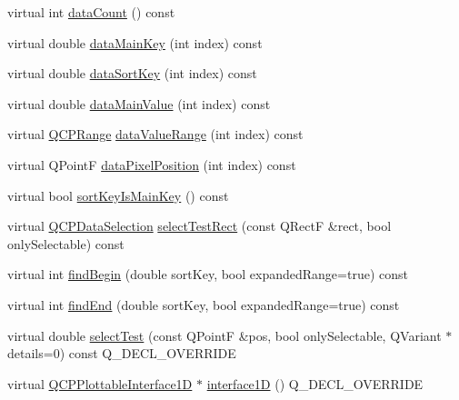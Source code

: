 \begin{DoxyCompactItemize}
\item 
virtual int \hyperlink{class_q_c_p_error_bars_ac3d99896de7fdf339d105fbff7f960be}{data\+Count} () const 
\item 
virtual double \hyperlink{class_q_c_p_error_bars_a4d3e459cf4739949f3566021a229ee53}{data\+Main\+Key} (int index) const 
\item 
virtual double \hyperlink{class_q_c_p_error_bars_a2b37b7ddb99e9e3ff76ac8f4172b7ee4}{data\+Sort\+Key} (int index) const 
\item 
virtual double \hyperlink{class_q_c_p_error_bars_aa4ac3e906e11d23e6ad9d30f15d6f991}{data\+Main\+Value} (int index) const 
\item 
virtual \hyperlink{class_q_c_p_range}{Q\+C\+P\+Range} \hyperlink{class_q_c_p_error_bars_a2b909b80bdfbe6f7ffa3f392528fab2a}{data\+Value\+Range} (int index) const 
\item 
virtual Q\+PointF \hyperlink{class_q_c_p_error_bars_a67d5d86bd035ffc47e33fcf6865e1480}{data\+Pixel\+Position} (int index) const 
\item 
virtual bool \hyperlink{class_q_c_p_error_bars_a668aeaf542891da7859e3075c6c1b5c6}{sort\+Key\+Is\+Main\+Key} () const 
\item 
virtual \hyperlink{class_q_c_p_data_selection}{Q\+C\+P\+Data\+Selection} \hyperlink{class_q_c_p_error_bars_a7d0336c69635e49e351c2c4cf5418ad2}{select\+Test\+Rect} (const Q\+RectF \&rect, bool only\+Selectable) const 
\item 
virtual int \hyperlink{class_q_c_p_error_bars_a87d81a85fc89a93e9cc5e31a9c011018}{find\+Begin} (double sort\+Key, bool expanded\+Range=true) const 
\item 
virtual int \hyperlink{class_q_c_p_error_bars_aa73016e62fb8dbef4dd44d0b080ddf8a}{find\+End} (double sort\+Key, bool expanded\+Range=true) const 
\item 
virtual double \hyperlink{class_q_c_p_error_bars_a78990786eb7632c9ba07105888eb6b1c}{select\+Test} (const Q\+PointF \&pos, bool only\+Selectable, Q\+Variant $\ast$details=0) const Q\+\_\+\+D\+E\+C\+L\+\_\+\+O\+V\+E\+R\+R\+I\+DE
\item 
virtual \hyperlink{class_q_c_p_plottable_interface1_d}{Q\+C\+P\+Plottable\+Interface1D} $\ast$ \hyperlink{class_q_c_p_error_bars_a0b6fbf3a943b4241ee485d066cc8562a}{interface1D} () Q\+\_\+\+D\+E\+C\+L\+\_\+\+O\+V\+E\+R\+R\+I\+DE
\end{DoxyCompactItemize}
